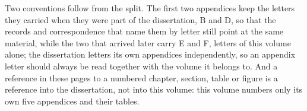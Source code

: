 \documentclass[
    12pt,
    openright,
    oneside,
    a4paper,
    sumario=tradicional,
    brazil,
    english,
]{abntex2}
\begin{document}
    Two conventions follow from the split. The first two appendices keep the letters they carried
    when they were part of the dissertation, B and D, so that the records and correspondence that
    name them by letter still point at the same material, while the two that arrived later carry
    E and F, letters of this volume alone; the dissertation letters its own appendices
    independently, so an appendix letter should always be read together with the volume it belongs
    to. And a reference in
    these pages to a numbered chapter, section, table or figure is a reference into the
    dissertation, not into this volume: this volume numbers only its own five appendices and
    their tables.
\end{document}
